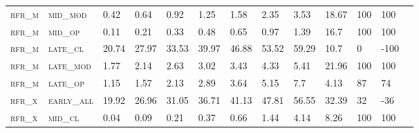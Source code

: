\begin{sidewaystable}[!htbp]
\begin{tabular}{@{}lllllllllllll@{}}
\footnotesize \textsc{rfr\_m}      & \footnotesize \textsc{mid\_mod  }               & \footnotesize 0.42            & \footnotesize 0.64            & \footnotesize 0.92             & \footnotesize 1.25             & \footnotesize 1.58             & \footnotesize 2.35             & \footnotesize 3.53        & \footnotesize 18.67    & \footnotesize 100    & \footnotesize 100      \\
\footnotesize \textsc{rfr\_m}      & \footnotesize \textsc{mid\_op   }               & \footnotesize 0.11            & \footnotesize 0.21            & \footnotesize 0.33             & \footnotesize 0.48             & \footnotesize 0.65             & \footnotesize 0.97             & \footnotesize 1.39        & \footnotesize 16.7     & \footnotesize 100    & \footnotesize 100      \\
\footnotesize \textsc{rfr\_m}      & \footnotesize \textsc{late\_cl  }               & \footnotesize 20.74           & \footnotesize 27.97           & \footnotesize 33.53            & \footnotesize 39.97            & \footnotesize 46.88            & \footnotesize 53.52            & \footnotesize 59.29       & \footnotesize 10.7     & \footnotesize 0      & \footnotesize -100     \\
\footnotesize \textsc{rfr\_m}      & \footnotesize \textsc{late\_mod }               & \footnotesize 1.77            & \footnotesize 2.14            & \footnotesize 2.63             & \footnotesize 3.02             & \footnotesize 3.43             & \footnotesize 4.33             & \footnotesize 5.41        & \footnotesize 21.96    & \footnotesize 100    & \footnotesize 100      \\
\footnotesize \textsc{rfr\_m}      & \footnotesize \textsc{late\_op  }               & \footnotesize 1.15            & \footnotesize 1.57            & \footnotesize 2.13             & \footnotesize 2.89             & \footnotesize 3.64             & \footnotesize 5.15             & \footnotesize 7.7         & \footnotesize 4.13     & \footnotesize 87     & \footnotesize 74       \\
\footnotesize \textsc{rfr\_x}      & \footnotesize \textsc{early\_all}               & \footnotesize 19.92           & \footnotesize 26.96           & \footnotesize 31.05            & \footnotesize 36.71            & \footnotesize 41.13            & \footnotesize 47.81            & \footnotesize 56.55       & \footnotesize 32.39    & \footnotesize 32     & \footnotesize -36      \\
\footnotesize \textsc{rfr\_x}      & \footnotesize \textsc{mid\_cl   }               & \footnotesize 0.04            & \footnotesize 0.09            & \footnotesize 0.21             & \footnotesize 0.37             & \footnotesize 0.66             & \footnotesize 1.44             & \footnotesize 4.14        & \footnotesize 8.26     & \footnotesize 100    & \footnotesize 100      \\

\end{tabular}
\end{sidewaystable}

